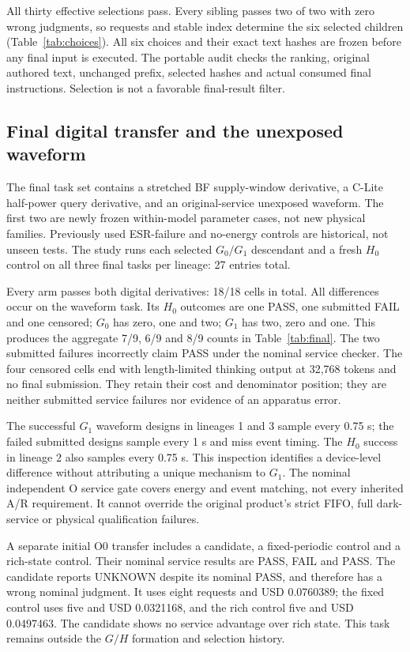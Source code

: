 
All thirty effective selections pass. Every sibling passes two of two with
zero wrong judgments, so requests and stable index determine the six selected
children (Table~\ref{tab:choices}). All six choices and their exact text hashes
are frozen before any final input is executed. The portable audit checks the
ranking, original authored text, unchanged prefix, selected hashes and actual
consumed final instructions. Selection is not a favorable final-result filter.

\subsection{Final digital transfer and the unexposed waveform}
The final task set contains a stretched BF supply-window derivative, a C-Lite
half-power query derivative, and an original-service unexposed waveform. The
first two are newly frozen within-model parameter cases, not new physical
families. Previously used ESR-failure and no-energy controls are historical,
not unseen tests. The study runs each selected $G_0/G_1$ descendant and a fresh
$H_0$ control on all three final tasks per lineage: 27 entries total.


Every arm passes both digital derivatives: 18/18 cells in total. All differences
occur on the waveform task. Its $H_0$ outcomes are one PASS, one submitted FAIL
and one censored; $G_0$ has zero, one and two; $G_1$ has two, zero and one.
This produces the aggregate 7/9, 6/9 and 8/9 counts in
Table~\ref{tab:final}. The two submitted failures incorrectly claim PASS under
the nominal service checker. The four censored cells end with length-limited
thinking output at 32,768 tokens and no final submission. They retain their
cost and denominator position; they are neither submitted service failures
nor evidence of an apparatus error.

The successful $G_1$ waveform designs in lineages 1 and 3 sample every 0.75 s;
the failed submitted designs sample every 1 s and miss event timing. The
$H_0$ success in lineage 2 also samples every 0.75 s. This inspection identifies
a device-level difference without attributing a unique mechanism to $G_1$.
The nominal independent O service gate covers energy and event matching, not
every inherited A/R requirement. It cannot override the original product's
strict FIFO, full dark-service or physical qualification failures.

A separate initial O0 transfer includes a candidate, a fixed-periodic control
and a rich-state control. Their nominal service results are PASS, FAIL and PASS.
The candidate reports UNKNOWN despite its nominal PASS, and therefore has a
wrong nominal judgment. It uses eight requests and USD 0.0760389; the fixed
control uses five and USD 0.0321168, and the rich control five and USD 0.0497463.
The candidate shows no service advantage over rich state. This task remains
outside the $G/H$ formation and selection history.

